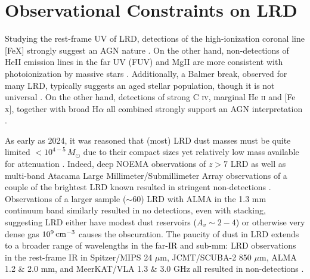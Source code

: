 \documentclass[utf8]{FrontiersinHarvard} %
\begin{document}
\section{Observational Constraints on LRD}
\label{sec:obsConstraining}
Studying the rest-frame UV of LRD, detections of the high-ionization coronal line [Fe\small{X}] strongly suggest an AGN nature \citep{kocevski2023hidden,furtak2024high}. 
On the other hand, non-detections of He\small{II} emission lines in the far UV (FUV) and Mg\small{II} are more consistent with photoionization by massive stars \citep{akins2024strong}. 
Additionally, a Balmer break, observed for many LRD, typically suggests an aged stellar population, though it is not universal \citep{akins2024strong}. 
On the other hand, detections of strong C \textsc{iv}, marginal He \textsc{ii} and [Fe \textsc{x}], together with broad H$\alpha$ all combined strongly support an AGN interpretation \citep{inayoshi2025extremely}. 


As early as 2024, it was reasoned that (most) LRD dust masses must be quite limited $< 10^{4-5}\,M_\odot$ due to their compact sizes yet relatively low mass available for attenuation \citep{casey2024dust}. Indeed, deep NOEMA observations of $z > 7$ LRD \citep{xiao2025no} as well as multi-band Atacama Large Millimeter/Submillimeter Array \citep[ALMA;][]{wootten2009atacama} observations of a couple of the brightest LRD known resulted in stringent non-detections \citep{setton2025confirmed}. Observations of a larger sample ($\sim 60$) LRD with ALMA in the 1.3 mm continuum band similarly resulted in no detections, even with stacking, suggesting LRD either have modest dust reservoirs  ($A_v \sim 2-4$) or otherwise very dense gas $10^9\,\rm{cm}^{-3}$ causes the obscuration. The paucity of dust in LRD extends to a broader range of wavelengths in the far-IR and sub-mm: LRD observations in the rest-frame IR in Spitzer/MIPS 24 $\mu$m, JCMT/SCUBA-2 850 $\mu$m, ALMA 1.2 \& 2.0 mm, and MeerKAT/VLA 1.3 \& 3.0 GHz all resulted in non-detections \citep{bao2025investigating}.
\end{document}
